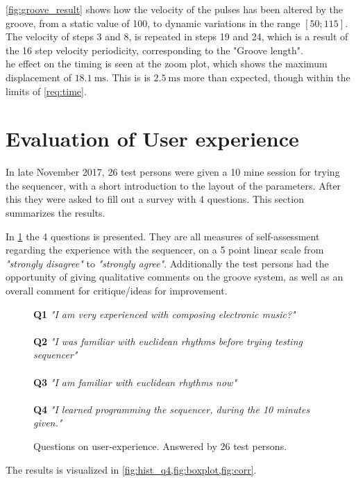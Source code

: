 \cref{fig:groove_result} shows how the velocity of the pulses has been altered by the groove, from a static value of 100, to dynamic variations in the range $[50;115]$. The velocity of steps 3 and 8, is repeated in steps 19 and 24, which is a result of the 16 step velocity periodicity, corresponding to the "Groove length". \\

he effect on the timing is seen at the zoom plot, which shows the maximum displacement of $\SI{18.1}{\milli\second}$. This is is $\SI{2.5}{\milli\second}$ more than expected, though within the limits of \cref{req:time}. 

\section{Evaluation of User experience}

In late November 2017, 26 test persons were given a 10 mine session for trying the sequencer, with a short introduction to the layout of the parameters. After this they were asked to fill out a survey with 4 questions. This section summarizes the results. 

In \cref{fig:questions} the 4 questions is presented. They are all measures of self-assessment regarding the experience with the sequencer, on a 5 point linear scale from \textit{"strongly disagree"} to \textit{"strongly agree"}. Additionally the test persons had the opportunity of giving qualitative comments on the groove system, as well as an overall comment for critique/ideas for improvement. \\

\begin{figure}[H]
    \centering
    \begin{factbox}
        \textbf{Q1} \textit{"I am very experienced with composing electronic music?"}
        \\\\
        \textbf{Q2} \textit{"I was familiar with euclidean rhythms before trying testing sequencer"}
        \\\\
        \textbf{Q3} \textit{"I am familiar with euclidean rhythms now"}
        \\\\
        \textbf{Q4} \textit{"I learned programming the sequencer, during the 10 minutes given."}

    \end{factbox}
    \caption{Questions on user-experience. Answered by 26 test persons.}
    \label{fig:questions}
\end{figure}
The results is visualized in \cref{fig:hist_q4,fig:boxplot,fig:corr}.

